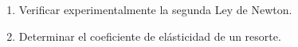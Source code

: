 \documentclass[../main.tex]{subfiles}
\begin{document}
\begin{enumerate}
    \item Verificar experimentalmente la segunda Ley de Newton.
    \item Determinar el coeficiente de elásticidad de un resorte.
\end{enumerate}
\end{document}
